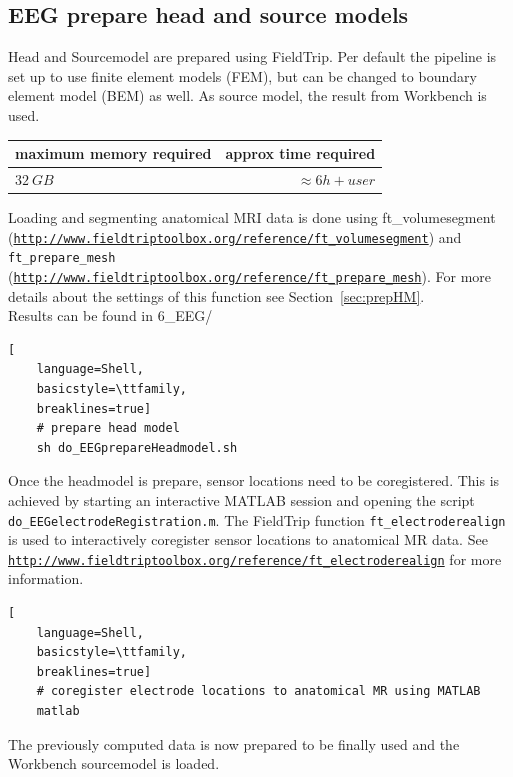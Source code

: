 \documentclass[12pt,a4paper]{scrartcl}
\begin{document}
\subsection{EEG prepare head and source models}
Head and Sourcemodel are prepared using FieldTrip. Per default the pipeline is set up to use finite element models (FEM), but can be changed to boundary element model (BEM) as well. As source model, the result from Workbench is used.
\label{sec:Sourcemodel}
\begin{table}[h]
\begin{tabular}{l | r}
\toprule
maximum memory required & approx time required\\\toprule
$32~GB$ & $\approx 6h+user$ \\\bottomrule
\end{tabular}
\end{table}
Loading and segmenting anatomical MRI data is done using ft\_volumesegment (\href{http://www.fieldtriptoolbox.org/reference/ft\_volumesegment}{\nolinkurl{http://www.fieldtriptoolbox.org/reference/ft\_volumesegment}}) and \texttt{ft\_prepare\_mesh} (\href{http://www.fieldtriptoolbox.org/reference/ft\_prepare\_mesh}{\nolinkurl{http://www.fieldtriptoolbox.org/reference/ft\_prepare\_mesh}}). For more details about the settings of this function see Section~\ref{sec:prepHM}.\\

\noindent Results can be found in 6\_EEG/\\
\begin{lstlisting}[
    language=Shell,
    basicstyle=\ttfamily,
    breaklines=true]
    # prepare head model
    sh do_EEGprepareHeadmodel.sh
\end{lstlisting}
Once the headmodel is prepare, sensor locations need to be coregistered. This is achieved by starting an interactive MATLAB session and opening the script \texttt{do\_EEGelectrodeRegistration.m}. The FieldTrip function \texttt{ft\_electroderealign} is used to interactively coregister sensor locations to anatomical MR data. See \href{http://www.fieldtriptoolbox.org/reference/ft\_electroderealign}{\nolinkurl{http://www.fieldtriptoolbox.org/reference/ft\_electroderealign}} for more information.\\

\begin{lstlisting}[
    language=Shell,
    basicstyle=\ttfamily,
    breaklines=true]
    # coregister electrode locations to anatomical MR using MATLAB
    matlab
\end{lstlisting}
The previously computed data is now prepared to be finally used and the Workbench sourcemodel is loaded.\\
\end{document}
